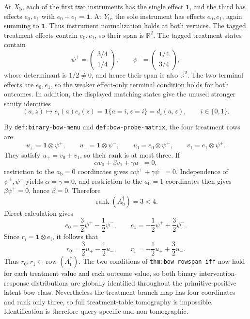 At \(X_{\mathrm b}\), each of the first two instruments has the single effect \(\mathbf 1\), and the third has effects \(e_0,e_1\) with \(e_0+e_1=\mathbf 1\).  At \(Y_{\mathrm b}\), the sole instrument has effects \(e_0,e_1\), again summing to \(\mathbf 1\).  Thus instrument normalization holds at both vertices.  The tagged treatment effects contain \(e_0,e_1\), so their span is \(\mathbb R^2\).  The tagged treatment states contain
\[
 \psi^+=\begin{pmatrix}3/4\\1/4\end{pmatrix},
 \qquad
 \psi^-=\begin{pmatrix}1/4\\3/4\end{pmatrix},
\]
whose determinant is \(1/2\ne0\), and hence their span is also \(\mathbb R^2\).  The two terminal effects are \(e_0,e_1\), so the weaker effect-only terminal condition holds for both outcomes.  In addition, the displayed matching states give the unused stronger sanity identities
\[
 (a,z)\longmapsto e_i(a)e_i(z)=\mathbf 1\{a=i,z=i\}=d_i(a,z),
 \qquad i\in\{0,1\}.
\]

By \texttt{def:binary-bow-menu} and \texttt{def:bow-probe-matrix}, the four treatment rows are
\[
 u_+=\mathbf 1\otimes\psi^+,
 \qquad u_-=\mathbf 1\otimes\psi^-,
 \qquad v_0=e_0\otimes\psi^+,
 \qquad v_1=e_1\otimes\psi^+.
\]
They satisfy \(u_+=v_0+v_1\), so their rank is at most three.  If
\[
 \alpha v_0+\beta v_1+\gamma u_-=0,
\]
restriction to the \(a_{\mathrm b}=0\) coordinates gives \(\alpha\psi^++\gamma\psi^-=0\).  Independence of \(\psi^+,\psi^-\) yields \(\alpha=\gamma=0\), and restriction to the \(a_{\mathrm b}=1\) coordinates then gives \(\beta\psi^+=0\), hence \(\beta=0\).  Therefore
\[
 \operatorname{rank}(A_{\mathrm b}^{\dagger})=3<4.
\]
Direct calculation gives
\[
 e_0=\frac32\psi^+-\frac12\psi^-,
 \qquad
 e_1=-\frac12\psi^++\frac32\psi^-.
\]
Since \(r_i=\mathbf 1\otimes e_i\), it follows that
\[
 r_0=\frac32u_+-\frac12u_-,
 \qquad
 r_1=-\frac12u_++\frac32u_-.
\]
Thus \(r_0,r_1\in\operatorname{row}(A_{\mathrm b}^{\dagger})\).  The two conditions of \texttt{thm:bow-rowspan-iff} now hold for each treatment value and each outcome value, so both binary intervention-response distributions are globally identified throughout the primitive-positive latent-bow class.  Nevertheless the treatment branch map has four coordinates and rank only three, so full treatment-table tomography is impossible.  Identification is therefore query specific and non-tomographic.